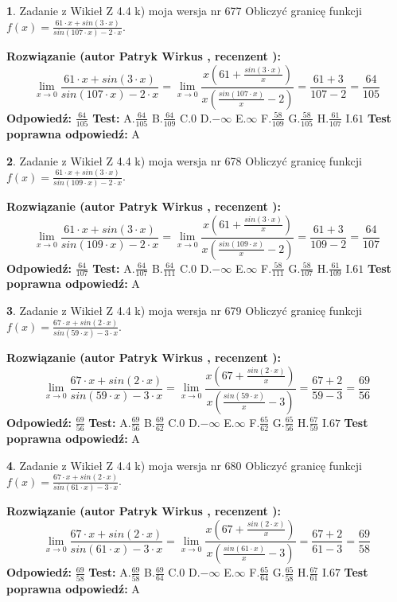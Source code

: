 \documentclass[12pt, a4paper]{article}
\theoremstyle{definition} %
\newtheorem{zad}{}
\newcommand{\zadStart}[1]{\begin{zad}#1\newline}
\newcommand{\zadStop}{\end{zad}}
\newcommand{\rozwStart}[2]{\noindent \textbf{Rozwiązanie (autor #1 , recenzent #2): }\newline}
\newcommand{\rozwStop}{\newline}
\newcommand{\odpStart}{\noindent \textbf{Odpowiedź:}\newline}
\newcommand{\odpStop}{\newline}
\newcommand{\testStart}{\noindent \textbf{Test:}\newline}
\newcommand{\testStop}{\newline}
\newcommand{\kluczStart}{\noindent \textbf{Test poprawna odpowiedź:}\newline}
\newcommand{\kluczStop}{\newline}
\begin{document}
\zadStart{Zadanie z Wikieł Z 4.4 k) moja wersja nr 677}
Obliczyć granicę funkcji $f(x)=\frac{61\cdot x +sin(3\cdot x)}{sin(107\cdot x) -2\cdot x}$.
\zadStop
\rozwStart{Patryk Wirkus}{}
$$\lim\limits_{x\to 0}\frac{61\cdot x +sin(3\cdot x)}{sin(107\cdot x) -2\cdot x}
=\lim\limits_{x\to 0}\frac{x(61+\frac{sin(3\cdot x)}{x})}{x(\frac{sin(107\cdot x)}{x}-2)}
=\frac{61+3}{107-2} = \frac{64}{105}$$
\rozwStop
\odpStart
$\frac{64}{105}$
\odpStop
\testStart
A.$\frac{64}{105}$
B.$\frac{64}{109}$
C.$0$
D.$-\infty$
E.$\infty$
F.$\frac{58}{109}$
G.$\frac{58}{105}$
H.$\frac{61}{107}$
I.$61$
\testStop
\kluczStart
A
\kluczStop



\zadStart{Zadanie z Wikieł Z 4.4 k) moja wersja nr 678}
Obliczyć granicę funkcji $f(x)=\frac{61\cdot x +sin(3\cdot x)}{sin(109\cdot x) -2\cdot x}$.
\zadStop
\rozwStart{Patryk Wirkus}{}
$$\lim\limits_{x\to 0}\frac{61\cdot x +sin(3\cdot x)}{sin(109\cdot x) -2\cdot x}
=\lim\limits_{x\to 0}\frac{x(61+\frac{sin(3\cdot x)}{x})}{x(\frac{sin(109\cdot x)}{x}-2)}
=\frac{61+3}{109-2} = \frac{64}{107}$$
\rozwStop
\odpStart
$\frac{64}{107}$
\odpStop
\testStart
A.$\frac{64}{107}$
B.$\frac{64}{111}$
C.$0$
D.$-\infty$
E.$\infty$
F.$\frac{58}{111}$
G.$\frac{58}{107}$
H.$\frac{61}{109}$
I.$61$
\testStop
\kluczStart
A
\kluczStop



\zadStart{Zadanie z Wikieł Z 4.4 k) moja wersja nr 679}
Obliczyć granicę funkcji $f(x)=\frac{67\cdot x +sin(2\cdot x)}{sin(59\cdot x) -3\cdot x}$.
\zadStop
\rozwStart{Patryk Wirkus}{}
$$\lim\limits_{x\to 0}\frac{67\cdot x +sin(2\cdot x)}{sin(59\cdot x) -3\cdot x}
=\lim\limits_{x\to 0}\frac{x(67+\frac{sin(2\cdot x)}{x})}{x(\frac{sin(59\cdot x)}{x}-3)}
=\frac{67+2}{59-3} = \frac{69}{56}$$
\rozwStop
\odpStart
$\frac{69}{56}$
\odpStop
\testStart
A.$\frac{69}{56}$
B.$\frac{69}{62}$
C.$0$
D.$-\infty$
E.$\infty$
F.$\frac{65}{62}$
G.$\frac{65}{56}$
H.$\frac{67}{59}$
I.$67$
\testStop
\kluczStart
A
\kluczStop



\zadStart{Zadanie z Wikieł Z 4.4 k) moja wersja nr 680}
Obliczyć granicę funkcji $f(x)=\frac{67\cdot x +sin(2\cdot x)}{sin(61\cdot x) -3\cdot x}$.
\zadStop
\rozwStart{Patryk Wirkus}{}
$$\lim\limits_{x\to 0}\frac{67\cdot x +sin(2\cdot x)}{sin(61\cdot x) -3\cdot x}
=\lim\limits_{x\to 0}\frac{x(67+\frac{sin(2\cdot x)}{x})}{x(\frac{sin(61\cdot x)}{x}-3)}
=\frac{67+2}{61-3} = \frac{69}{58}$$
\rozwStop
\odpStart
$\frac{69}{58}$
\odpStop
\testStart
A.$\frac{69}{58}$
B.$\frac{69}{64}$
C.$0$
D.$-\infty$
E.$\infty$
F.$\frac{65}{64}$
G.$\frac{65}{58}$
H.$\frac{67}{61}$
I.$67$
\testStop
\kluczStart
A
\kluczStop
\end{document}
